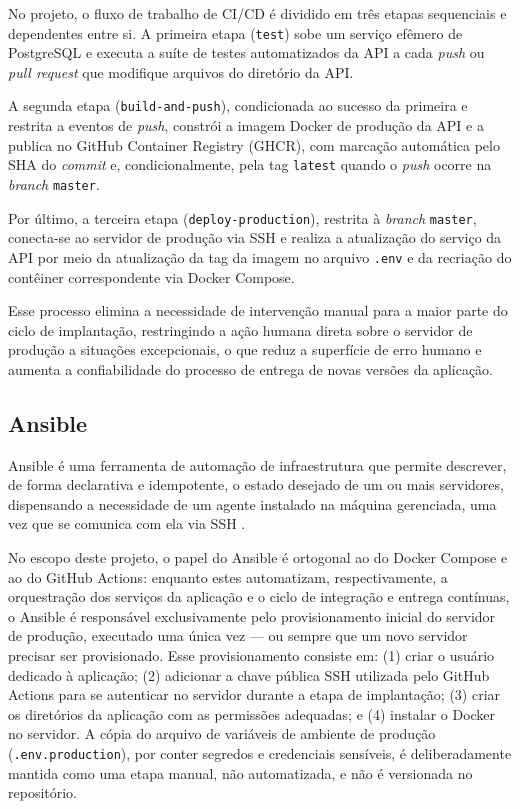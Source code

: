 No projeto, o fluxo de trabalho de CI/CD é dividido em três etapas
sequenciais e dependentes entre si. A primeira etapa (\texttt{test}) sobe um
serviço efêmero de PostgreSQL e executa a suíte de testes automatizados da
API a cada \textit{push} ou \textit{pull request} que modifique arquivos do
diretório da API.

A segunda etapa (\texttt{build-and-push}), condicionada ao
sucesso da primeira e restrita a eventos de \textit{push}, constrói a imagem
Docker de produção da API e a publica no GitHub Container Registry (GHCR),
com marcação automática pelo SHA do \textit{commit} e, condicionalmente, pela
tag \texttt{latest} quando o \textit{push} ocorre na \textit{branch}
\texttt{master}.

Por último, a terceira etapa (\texttt{deploy-production}), restrita à
\textit{branch} \texttt{master}, conecta-se ao servidor de produção via SSH e
realiza a atualização do serviço da API por meio da atualização da tag da
imagem no arquivo \texttt{.env} e da recriação do contêiner correspondente
via Docker Compose.

Esse processo elimina a necessidade de intervenção manual para a maior
parte do ciclo de implantação, restringindo a ação humana direta sobre o
servidor de produção a situações excepcionais, o que reduz a superfície de
erro humano e aumenta a confiabilidade do processo de entrega de novas
versões da aplicação.

\subsection{Ansible}

Ansible é uma ferramenta de automação de infraestrutura que permite
descrever, de forma declarativa e idempotente, o estado desejado de um ou
mais servidores, dispensando a necessidade de um agente instalado na máquina
gerenciada, uma vez que se comunica com ela via SSH \citep{ansible:2026}.

No escopo deste projeto, o papel do Ansible é ortogonal ao do Docker Compose
e ao do GitHub Actions: enquanto estes automatizam, respectivamente, a
orquestração dos serviços da aplicação e o ciclo de integração e entrega
contínuas, o Ansible é responsável exclusivamente pelo provisionamento
inicial do servidor de produção, executado uma única vez --- ou sempre que um
novo servidor precisar ser provisionado. Esse provisionamento consiste em:
(1) criar o usuário dedicado à aplicação; (2) adicionar a chave pública SSH
utilizada pelo GitHub Actions para se autenticar no servidor durante a etapa
de implantação; (3) criar os diretórios da aplicação com as permissões
adequadas; e (4) instalar o Docker no servidor. A cópia do arquivo de
variáveis de ambiente de produção (\texttt{.env.production}), por conter
segredos e credenciais sensíveis, é deliberadamente mantida como uma etapa
manual, não automatizada, e não é versionada no repositório.

